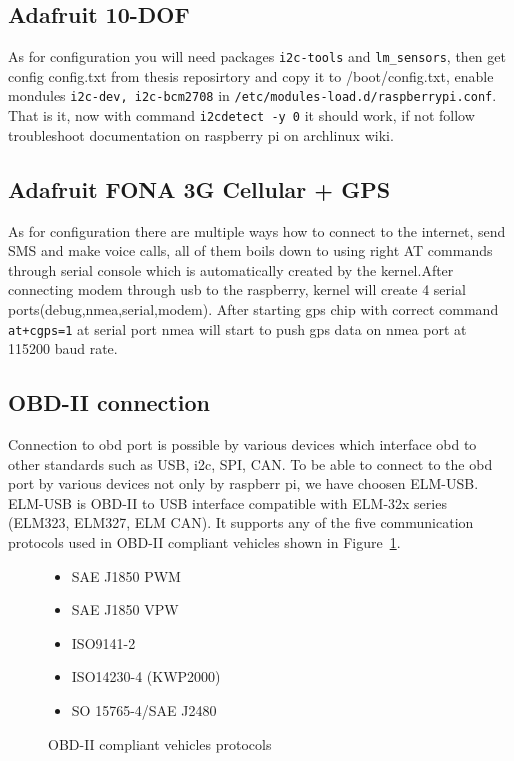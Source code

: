 \subsection{Adafruit 10-DOF} %
\label{sub:adafruit_10_dof}
As for configuration you will need packages \verb|i2c-tools| and \verb|lm_sensors|, then get config config.txt from thesis reposirtory and copy it to /boot/config.txt, enable mondules \verb|i2c-dev, i2c-bcm2708| in \verb|/etc/modules-load.d/raspberrypi.conf|. That is it, now with command \verb|i2cdetect -y 0| it should work, if not follow troubleshoot documentation on raspberry pi on archlinux wiki\cite{rpi_wiki}.
\subsection{Adafruit FONA 3G Cellular + GPS} %
\label{sub:adafruit_fona_3g_cellular_gps_}
 As for configuration there are multiple ways how to connect to the internet, send SMS and make voice calls, all of them boils down to using right AT commands through serial console which is automatically created by the kernel.After connecting modem through usb to the raspberry, kernel will create 4 serial ports(debug,nmea,serial,modem). After starting gps chip with correct command \verb|at+cgps=1| at serial port nmea will start to push gps data on nmea port at 115200 baud rate.\cite{at_doc}
\subsection{OBD-II connection} %
\label{sub:obd_ii_connection}
Connection to \gls{obd} port is possible by various devices which interface \gls{obd} to other standards such as USB, \gls{i2c}, SPI, CAN. To be able to connect to the \gls{obd} port by various devices not only by raspberr pi, we have choosen ELM-USB. ELM-USB is OBD-II to USB interface compatible with ELM-32x series (ELM323, ELM327, ELM CAN).\cite{elm_site} It supports any of the five communication protocols used in OBD-II compliant vehicles shown in Figure~\ref{fig:obd_protocol}.
\begin{figure}[htbp]
	\centering
	\begin{itemize}
		\item SAE J1850 PWM
		\item SAE J1850 VPW
		\item ISO9141-2
		\item ISO14230-4 (KWP2000)
		\item SO 15765-4/SAE J2480
	\end{itemize}
	\caption{OBD-II compliant vehicles protocols}
	\label{fig:obd_protocol}
\end{figure}
